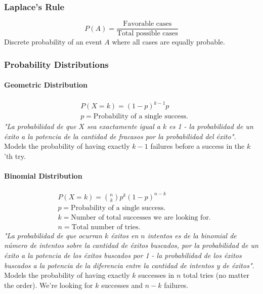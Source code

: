 \documentclass[letterpaper,landscape]{article}
\begin{document}
\subsubsection{Laplace's Rule}

$$
  P(A) = \frac{\text{Favorable cases}}{\text{Total possible cases}}
$$
Discrete probability of an event $A$ where all cases are equally probable.

\subsubsection{Probability Distributions}

\paragraph{Geometric Distribution}

\begin{align*}
  &P(X = k) = (1 - p)^{k-1}p\\
  &p = \text{Probability of a single success.}
\end{align*}
\textit{"La probabilidad de que $X$ sea exactamente igual a $k$ es 1 - la probabilidad de un éxito a la potencia de la cantidad de fracasos por la probabilidad del éxito".}\\
Models the probability of having exactly $k-1$ failures before a success in the $k$'th try.

\paragraph{Binomial Distribution}

\begin{align*}
  &P(X = k) = \binom{n}{k}p^k(1-p)^{n-k}\\
  &p = \text{Probability of a single success.}\\
  &k = \text{Number of total successes we are looking for.}\\
  &n = \text{Total number of tries.}
\end{align*}
\textit{"La probabilidad de que ocurran $k$ éxitos en $n$ intentos es de la binomial de número de intentos sobre la cantidad de éxitos buscados, por la probabilidad de un éxito a la potencia de los éxitos buscados por 1 - la probabilidad de los éxitos buscados a la potencia de la diferencia entre la cantidad de intentos y de éxitos".}\\
Models the probability of having exactly $k$ successes in $n$ total tries (no matter the order). We're looking for $k$ successes and $n-k$ failures.
\end{document}
